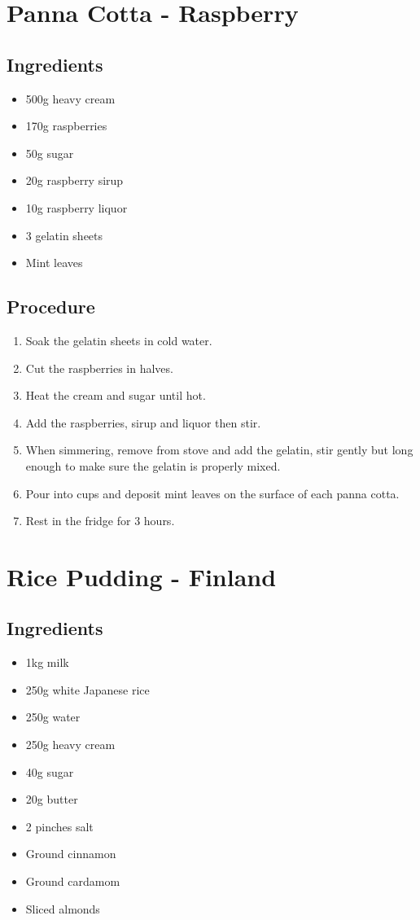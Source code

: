 \documentclass[10pt]{book}
\begin{document}

\newpage
\section*{Panna Cotta - Raspberry}
\subsection*{Ingredients}
	\begin{itemize}
		\item 500g heavy cream
		\item 170g raspberries
		\item 50g sugar
		\item 20g raspberry sirup
		\item 10g raspberry liquor
		\item 3 gelatin sheets
		\item Mint leaves
	\end{itemize}
\subsection*{Procedure}
	\begin{enumerate}
		\item Soak the gelatin sheets in cold water.
		\item Cut the raspberries in halves.
		\item Heat the cream and sugar until hot.
		\item Add the raspberries, sirup and liquor then stir.
		\item When simmering, remove from stove and add the gelatin, stir gently but long enough to make sure the gelatin is properly mixed.
		\item Pour into cups and deposit mint leaves on the surface of each panna cotta.
		\item Rest in the fridge for 3 hours.
	\end{enumerate}
\newpage


\newpage
\section*{Rice Pudding - Finland}
\subsection*{Ingredients}
	\begin{itemize}
		\item 1kg milk
		\item 250g white Japanese rice
		\item 250g water
		\item 250g heavy cream
		\item 40g sugar
		\item 20g butter
		\item 2 pinches salt
		\item Ground cinnamon
		\item Ground cardamom
		\item Sliced almonds
	\end{itemize}
\end{document}
